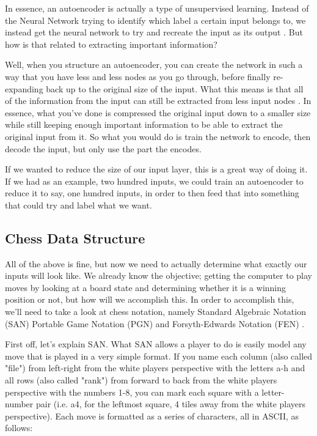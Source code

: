 \documentclass[12pt]{article}
\begin{document}
    In essence, an autoencoder is actually a type of unsupervised learning. Instead of the Neural Network trying to identify which label a certain input belongs to, we instead get the neural network to try and recreate the input as its output \cite{nn_autoencoders}. But how is that related to extracting important information?

    Well, when you structure an autoencoder, you can create the network in such a way that you have less and less nodes as you go through, before finally re-expanding back up to the original size of the input. What this means is that all of the information from the input can still be extracted from less input nodes \cite{deepchess}. In essence, what you've done is compressed the original input down to a smaller size while still keeping enough important information to be able to extract the original input from it. So what you would do is train the network to encode, then decode the input, but only use the part the encodes.

    If we wanted to reduce the size of our input layer, this is a great way of doing it. If we had as an example, two hundred inputs, we could train an autoencoder to reduce it to say, one hundred inputs, in order to then feed that into something that could try and label what we want. 

    \subsection{Chess Data Structure}

    All of the above is fine, but now we need to actually determine what exactly our inputs will look like. We already know the objective; getting the computer to play moves by looking at a board state and determining whether it is a winning position or not, but how will we accomplish this. In order to accomplish this, we'll need to take a look at chess notation, namely Standard Algebraic Notation (SAN) Portable Game Notation (PGN) and Forsyth-Edwards Notation (FEN) \cite{pgnrules}.

    First off, let's explain SAN. What SAN allows a player to do is easily model any move that is played in a very simple format. If you name each column (also called "file") from left-right from the white players perspective with the letters a-h and all rows (also called "rank") from forward to back from the white players perspective with the numbers 1-8, you can mark each square with a letter-number pair (i.e. a4, for the leftmost square, 4 tiles away from the white players perspective). Each move is formatted as a series of characters, all in ASCII, as follows:
\end{document}
